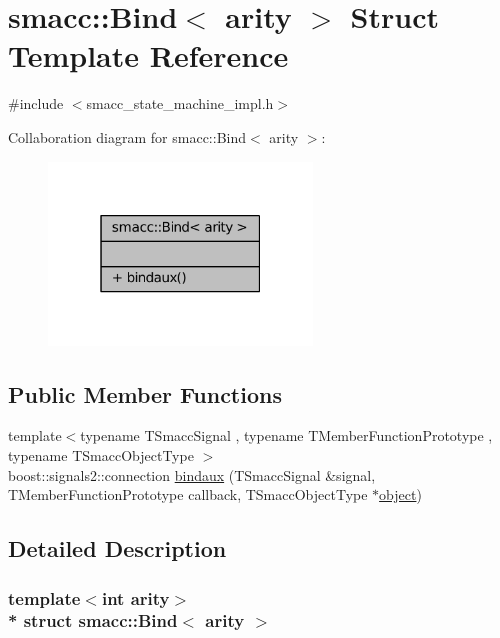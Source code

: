 \hypertarget{structsmacc_1_1Bind}{}\section{smacc\+:\+:Bind$<$ arity $>$ Struct Template Reference}
\label{structsmacc_1_1Bind}


{\ttfamily \#include $<$smacc\+\_\+state\+\_\+machine\+\_\+impl.\+h$>$}



Collaboration diagram for smacc\+:\+:Bind$<$ arity $>$\+:
\nopagebreak
\begin{figure}[H]
\begin{center}
\leavevmode
\includegraphics[width=199pt]{structsmacc_1_1Bind__coll__graph}
\end{center}
\end{figure}
\subsection*{Public Member Functions}
\begin{DoxyCompactItemize}
\item 
{\footnotesize template$<$typename T\+Smacc\+Signal , typename T\+Member\+Function\+Prototype , typename T\+Smacc\+Object\+Type $>$ }\\boost\+::signals2\+::connection \hyperlink{structsmacc_1_1Bind_a1e91999cbea400f14f3b865396df72a9}{bindaux} (T\+Smacc\+Signal \&signal, T\+Member\+Function\+Prototype callback, T\+Smacc\+Object\+Type $\ast$\hyperlink{classobject}{object})
\end{DoxyCompactItemize}


\subsection{Detailed Description}
\subsubsection*{template$<$int arity$>$\\*
struct smacc\+::\+Bind$<$ arity $>$}



